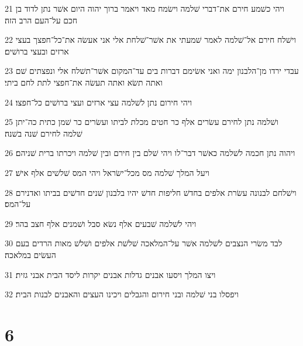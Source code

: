 \par 21 ויהי כשׁמע חירם את־דברי שׁלמה וישׂמח מאד ויאמר ברוך יהוה היום אשׁר נתן לדוד בן חכם על־העם הרב הזה׃
\par 22 וישׁלח חירם אל־שׁלמה לאמר שׁמעתי את אשׁר־שׁלחת אלי אני אעשׂה את־כל־חפצך בעצי ארזים ובעצי ברושׁים׃
\par 23 עבדי ירדו מן־הלבנון ימה ואני אשׂימם דברות בים עד־המקום אשׁר־תשׁלח אלי ונפצתים שׁם ואתה תשׂא ואתה תעשׂה את־חפצי לתת לחם ביתי׃
\par 24 ויהי חירום נתן לשׁלמה עצי ארזים ועצי ברושׁים כל־חפצו׃
\par 25 ושׁלמה נתן לחירם עשׂרים אלף כר חטים מכלת לביתו ועשׂרים כר שׁמן כתית כה־יתן שׁלמה לחירם שׁנה בשׁנה׃
\par 26 ויהוה נתן חכמה לשׁלמה כאשׁר דבר־לו ויהי שׁלם בין חירם ובין שׁלמה ויכרתו ברית שׁניהם׃
\par 27 ויעל המלך שׁלמה מס מכל־ישׂראל ויהי המס שׁלשׁים אלף אישׁ׃
\par 28 וישׁלחם לבנונה עשׂרת אלפים בחדשׁ חליפות חדשׁ יהיו בלבנון שׁנים חדשׁים בביתו ואדנירם על־המס׃
\par 29 ויהי לשׁלמה שׁבעים אלף נשׂא סבל ושׁמנים אלף חצב בהר׃
\par 30 לבד משׂרי הנצבים לשׁלמה אשׁר על־המלאכה שׁלשׁת אלפים ושׁלשׁ מאות הרדים בעם העשׂים במלאכה׃
\par 31 ויצו המלך ויסעו אבנים גדלות אבנים יקרות ליסד הבית אבני גזית׃
\par 32 ויפסלו בני שׁלמה ובני חירום והגבלים ויכינו העצים והאבנים לבנות הבית׃

\chapter{6}

